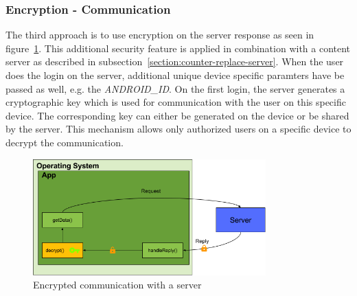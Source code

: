 \subsubsection{Encryption - Communication} \label{section:counter-replace-encryption-content-communication}
The third approach is to use encryption on the server response as seen in figure~\ref{fig:encryptionComm}.
This additional security feature is applied in combination with a content server as described in subsection~\ref{section:counter-replace-server}.
\newline
When the user does the login on the server, additional unique device specific paramters have be passed as well, e.g. the \textit{ANDROID\_ID}.
On the first login, the server generates a cryptographic key which is used for communication with the user on this specific device.
The corresponding key can either be generated on the device or be shared by the server.
This mechanism allows only authorized users on a specific device to decrypt the communication.
\newline
\begin{figure}[h]
    \centering
    \includegraphics[width=0.8\textwidth]{data/encryptionComm.png}
    \caption{Encrypted communication with a server}
    \label{fig:encryptionComm}
\end{figure}

